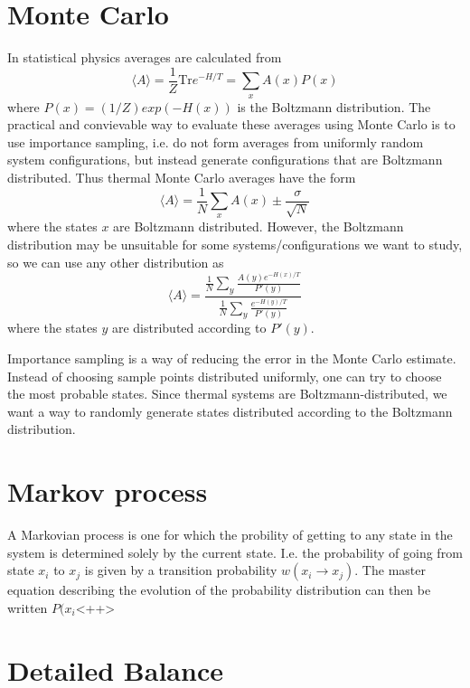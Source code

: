 \documentclass[a4paper]{article}
\newcommand{\trm}[1]{\textrm{#1}}
\begin{document}
\section{Monte Carlo}
In statistical physics averages are calculated from 
\begin{equation}
  \langle A\rangle = \frac{1}{Z}\trm{Tr} e^{-H/T} = \sum_x A(x) P(x)
  \label{}
\end{equation}
where  $P(x) = (1/Z)exp(-H(x))$ is the Boltzmann distribution.
The practical and convievable way to evaluate these averages using Monte Carlo is to use importance sampling, i.e. do not form averages from uniformly random system configurations, but instead generate configurations that are Boltzmann distributed.   
Thus thermal Monte Carlo averages have the form 
\begin{equation}
  \langle A \rangle = \frac{1}{N} \sum_x A(x) \pm \frac{\sigma	}{\sqrt N}
  \label{}
\end{equation}
where the states $x$ are Boltzmann distributed.
However, the Boltzmann distribution may be unsuitable for some systems/configurations we want to study, so we can use any other distribution as 
\begin{equation}
  \langle A \rangle = \frac{\frac{1}{N}\sum_y \frac{A(y) e^{-H(x)/T}}{P'(y)}}{\frac{1}{N}\sum_y \frac{e^{-H(y)/T}}{P'(y)}}  
  \label{}
\end{equation}
 where the states $y$ are distributed according to $P'(y)$.

 Importance sampling is a way of reducing the error in the Monte Carlo estimate. Instead of choosing sample points distributed uniformly, one can try to choose the most probable states. Since thermal systems are Boltzmann-distributed, we want a way to randomly generate states distributed according to the Boltzmann distribution.
 \section{Markov process}
 A Markovian process is one for which the probility of getting to any state in the system is determined solely by the current state. I.e. the probability of going from state $x_i$ to $x_{j}$ is given by a transition probability $w(x_i \rightarrow x_j)$. The master equation describing the evolution of the probability distribution can then be written $P(x_i $<++>
 
\section{Detailed Balance}
\end{document}
